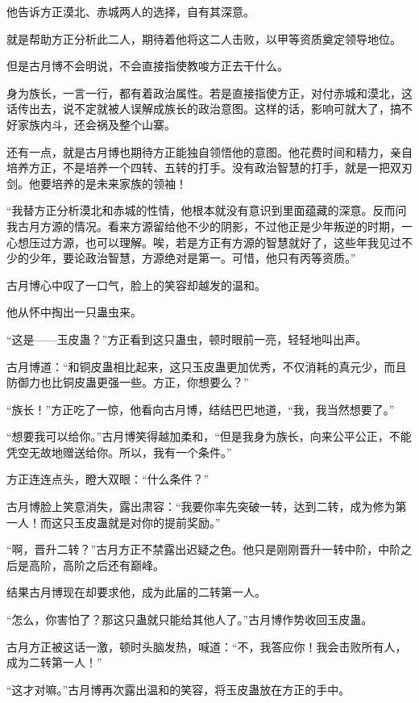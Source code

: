 \begin{this_body}
他告诉方正漠北、赤城两人的选择，自有其深意。

就是帮助方正分析此二人，期待着他将这二人击败，以甲等资质奠定领导地位。

但是古月博不会明说，不会直接指使教唆方正去干什么。

身为族长，一言一行，都有着政治属性。若是直接指使方正，对付赤城和漠北，这话传出去，说不定就被人误解成族长的政治意图。这样的话，影响可就大了，搞不好家族内斗，还会祸及整个山寨。

还有一点，就是古月博也期待方正能独自领悟他的意图。他花费时间和精力，亲自培养方正，不是培养一个四转、五转的打手。没有政治智慧的打手，就是一把双刃剑。他要培养的是未来家族的领袖！

“我替方正分析漠北和赤城的性情，他根本就没有意识到里面蕴藏的深意。反而问我古月方源的情况。看来方源留给他不少的阴影，不过他正是少年叛逆的时期，一心想压过方源，也可以理解。唉，若是方正有方源的智慧就好了，这些年我见过不少的少年，要论政治智慧，方源绝对是第一。可惜，他只有丙等资质。”

古月博心中叹了一口气，脸上的笑容却越发的温和。

他从怀中掏出一只蛊虫来。

“这是——玉皮蛊？”方正看到这只蛊虫，顿时眼前一亮，轻轻地叫出声。

古月博道：“和铜皮蛊相比起来，这只玉皮蛊更加优秀，不仅消耗的真元少，而且防御力也比铜皮蛊更强一些。方正，你想要么？”

“族长！”方正吃了一惊，他看向古月博，结结巴巴地道，“我，我当然想要了。”

“想要我可以给你。”古月博笑得越加柔和，“但是我身为族长，向来公平公正，不能凭空无故地赠送给你。所以，我有一个条件。”

方正连连点头，瞪大双眼：“什么条件？”

古月博脸上笑意消失，露出肃容：“我要你率先突破一转，达到二转，成为修为第一人！而这只玉皮蛊就是对你的提前奖励。”

“啊，晋升二转？”古月方正不禁露出迟疑之色。他只是刚刚晋升一转中阶，中阶之后是高阶，高阶之后还有巅峰。

结果古月博现在却要求他，成为此届的二转第一人。

“怎么，你害怕了？那这只蛊就只能给其他人了。”古月博作势收回玉皮蛊。

古月方正被这话一激，顿时头脑发热，喊道：“不，我答应你！我会击败所有人，成为二转第一人！”

“这才对嘛。”古月博再次露出温和的笑容，将玉皮蛊放在方正的手中。


\end{this_body}
